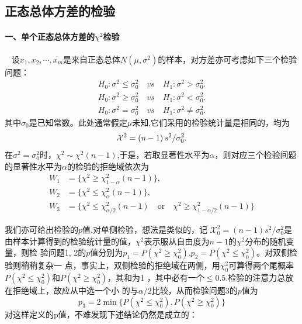 \subsection{正态总体方差的检验}
\paragraph{一、单个正态总体方差的$\chi^2$检验}~{}
设$x_{1},x_{2},\cdots,x_{m}$是来自正态总体$N(\mu,\sigma^2)$的样本，对方差亦可考虑如下三个检验问题：
\begin{align}
    H_{0}:\sigma^{2}\leq\sigma_{0}^{2} \quad vs \quad H_{1}:\sigma^{2}>\sigma_{0}^{2}. \\
    H_{0}:\sigma^{2}\geq\sigma_{0}^{2} \quad vs \quad H_{1}:\sigma^{2}<\sigma_{0}^{2}. \\
    H_{0}:\sigma^{2}=\sigma_{0}^{2} \quad vs \quad H_{1}:\sigma^{2}\neq\sigma_{0}^{2}.
\end{align}
其中$\sigma_0$是已知常数。此处通常假定$\mu$未知,它们采用的检验统计量是相同的，均为
\begin{equation}\mathcal {X}^{2}=\left({n-1}\\ \right)s^{2}/\sigma_{0}^{2}.\end{equation}
在$\sigma^2=\sigma_0^2$时，$\chi^2\sim \chi^2(n-1)$,于是，若取显著性水平为$\alpha$，则对应三个检验间题的显著性水平为$\alpha$的检验的拒绝域依次为
$$
    \begin{aligned}
        W_{1} & =\{\chi^{2}\geq\chi_{1-\alpha}^{2}(n-1)\},                                                           \\
        W_{2} & =\{\chi^{2}\leq\chi_{\alpha}^{2}(n-1)\},                                                             \\
        W_{3} & =\{\chi^{2}\leq\chi_{\alpha/2}^{2}(n-1)\quad\text{or}\quad\chi^{2} \geq \chi_{1-\alpha/2}^{2}(n-1)\}
    \end{aligned}
$$

我们亦可给出检验的$p$值.对单侧检验，想法是类似的，记 ${\mathcal X}_{0}^{2}=(n-1)s^{2}/\sigma_{0}^{2}$是由样本计算得到的检验统计量的值，$\chi^2$表示服从自由度为$n-1$的$\chi^2$分布的随机变量，则检
验问题1, 2的$p$值分别为$p_1=P(\chi^2 \geq \chi_0^2)$,$p_2 = P(\chi^2 \leq \chi_0^2)$。对双侧检验则稍稍复杂一
点，事实上，双侧检验的拒绝域在两侧，用$\chi_0^2$可算得两个尾概率$P(\chi^2 \leq \chi_0^2)$和$P(\chi^2 \geq \chi_0^2)$，其和为1 ，其中必有一个$\leq 0.5$.检验的注意力总放在拒绝域上，故应从中选一个小
的与$\alpha / 2$比较，从而检验问题3的$p$值为
\begin{equation}
    p_3 = 2\min\{P(\chi^2 \leq \chi_0^2),P(\chi^2 \geq \chi_0^2)\}
\end{equation}
对这样定义的p值，不难发现下述结论仍然是成立的：


